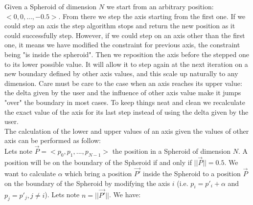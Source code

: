 Given a Spheroid of dimension $N$ we start from an arbitrary position: $<0,0,...,-0.5>$. From there we step the axis starting from the first one. If we could step an axis the step algorithm stops and return the new position as it could successfully step. However, if we could step on an axis other than the first one, it means we have modified the constraint for previous axis, the constraint being "is inside the spheroid". Then we reposition the axis before the stepped one to its lower possible value. It will allow it to step again at the next iteration on a new boundary defined by other axis values, and this scale up naturally to any dimension. Care must be care to the case when an axis reaches its upper value: the delta given by the user and the influence of other axis value make it jumps "over" the boundary in most cases. To keep things neat and clean we recalculate the exact value of the axis for its last step instead of using the delta given by the user.\\

The calculation of the lower and upper values of an axis given the values of other axis can be performed as follow:\\

Lets note $\overrightarrow{P}=<p_0,p_1,...,p_{N-1}>$ the position in a Spheroid of dimension $N$. A position will be on the boundary of the Spheroid if and only if $||\overrightarrow{P}||=0.5$. We want to calculate $\alpha$ which bring a position $\overrightarrow{P'}$ inside the Spheroid to a position $\overrightarrow{P}$ on the boundary of the Spheroid by modifying the axis $i$ (i.e. $p_i=p'_i+\alpha$ and $p_j=p'_j,j\neq i$). Lets note $n=||\overrightarrow{P'}||$. We have:\\

